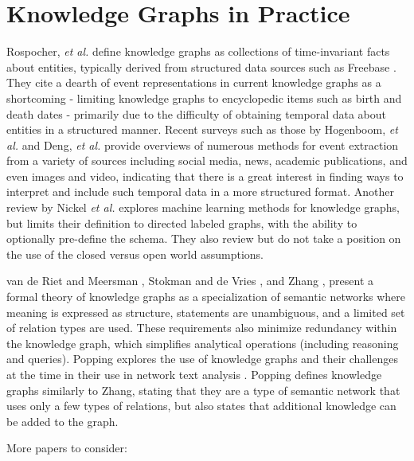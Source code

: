 \section{Knowledge Graphs in Practice}
Rospocher, \textit{et al.} define knowledge graphs as collections of time-invariant facts about entities, typically derived from structured data sources such as Freebase \cite{Rospocher2016}. They cite a dearth of event representations in current knowledge graphs as a shortcoming - limiting knowledge graphs to encyclopedic items such as birth and death dates - primarily due to the difficulty of obtaining temporal data about entities in a structured manner. Recent surveys such as those by Hogenboom, \textit{et al.} \cite{Hogenboom2016} and Deng, \textit{et al.} \cite{Deng2015} provide overviews of numerous methods for event extraction from a variety of sources including social media, news, academic publications, and even images and video, indicating that there is a great interest in finding ways to interpret and include such temporal data in a more structured format.
Another review by Nickel \emph{et al.} explores machine learning methods for knowledge graphs, but limits their definition to directed labeled graphs, with the ability to optionally pre-define the schema.
They also review but do not take a position on the use of the closed versus open world assumptions.

van de Riet and Meersman \cite{van1992knowledge}, Stokman and de Vries \cite{Stokman_1988}, and Zhang \cite{zhang2002knowledge}, present a formal theory of knowledge graphs as a specialization of semantic networks where meaning is expressed as structure, statements are unambiguous, and a limited set of relation types are used.
These requirements also minimize redundancy within the knowledge graph, which simplifies analytical operations (including reasoning and queries).
Popping explores the use of knowledge graphs and their challenges at the time in their use in network text analysis \cite{Popping_2003}. 
Popping defines knowledge graphs similarly to Zhang, stating that they are a type of semantic network that uses only a few types of relations, but also states that additional knowledge can be added to the graph.

More papers to consider: \cite{Dieng_1992} \cite{Juel_Vang_2013}

